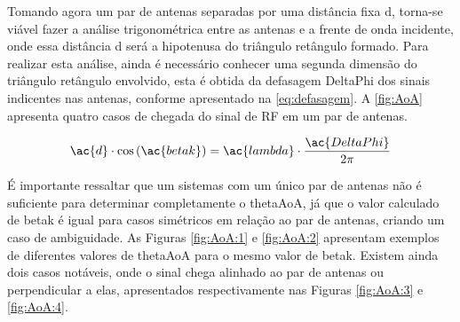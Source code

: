 
Tomando agora um par de antenas separadas por uma distância fixa \ac{d}, torna-se viável fazer a análise trigonométrica entre as antenas e a frente de onda incidente, onde essa distância \ac{d} será a hipotenusa do triângulo retângulo formado.
Para realizar esta análise, ainda é necessário conhecer uma segunda dimensão do triângulo retângulo envolvido, esta é obtida da defasagem \ac{DeltaPhi} dos sinais indicentes nas antenas, conforme apresentado na \autoref{eq:defasagem}.
A \autoref{fig:AoA} apresenta quatro casos de chegada do sinal de \ac{RF} em um par de antenas.


\begin{equation} \label{eq:defasagem}
    \ac{d} \cdot
    \cos\left(\ac{betak}\right) =
    \ac{lambda} \cdot
    \frac{\ac{DeltaPhi}}{2 \pi}
\end{equation}


É importante ressaltar que um sistemas com um único par de antenas não é suficiente para determinar completamente o \ac{thetaAoA}, já que o valor calculado de \ac{betak} é igual para casos simétricos em relação ao par de antenas, criando um caso de ambiguidade.
As Figuras \ref{fig:AoA:1} e \ref{fig:AoA:2} apresentam exemplos de diferentes valores de \ac{thetaAoA} para o mesmo valor de \ac{betak}.
Existem ainda dois casos notáveis, onde o sinal chega alinhado ao par de antenas ou perpendicular a elas, apresentados respectivamente nas Figuras \ref{fig:AoA:3} e \ref{fig:AoA:4}.

